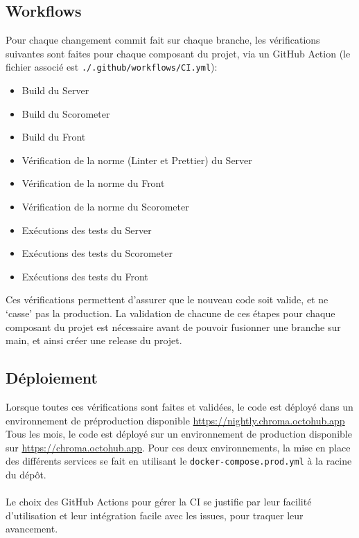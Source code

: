
\subsection{Workflows}
	Pour chaque changement commit fait sur chaque branche, les vérifications suivantes sont faites pour chaque composant du projet, via un GitHub Action (le fichier associé est \verb|./.github/workflows/CI.yml|):

	\begin{itemize}
		\item Build du Server
		\item Build du Scorometer
		\item Build du Front
		\item Vérification de la norme (Linter et Prettier) du Server
		\item Vérification de la norme du Front
		\item Vérification de la norme du Scorometer
		\item Exécutions des tests du Server
		\item Exécutions des tests du Scorometer
		\item Exécutions des tests du Front
	\end{itemize}

	Ces vérifications permettent d’assurer que le nouveau code soit valide, et ne ‘casse’ pas la production.
	La validation de chacune de ces étapes pour chaque composant du projet est nécessaire avant de pouvoir fusionner une branche sur main, et ainsi créer une release du projet.

\subsection{Déploiement}
	Lorsque toutes ces vérifications sont faites et validées, le code est déployé dans un environnement de préproduction disponible \url{https://nightly.chroma.octohub.app}
	Tous les mois, le code est déployé sur un environnement de production disponible sur \url{https://chroma.octohub.app}. Pour ces deux environnements, la mise en place des différents services se fait en utilisant le \verb|docker-compose.prod.yml| à la racine du dépôt.
	\\\\
	Le choix des GitHub Actions pour gérer la CI se justifie par leur facilité d'utilisation et leur intégration facile avec les issues, pour traquer leur avancement.
